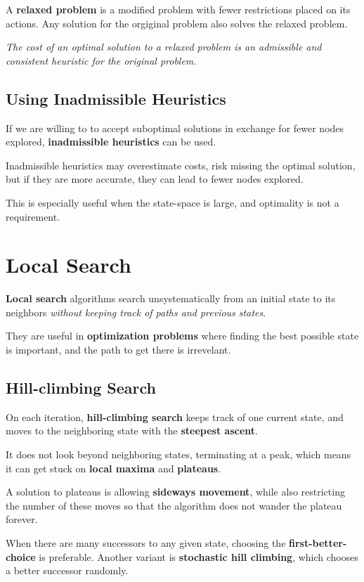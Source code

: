 \begin{multicols*}{2}
            A \textbf{relaxed problem} is a modified problem with fewer restrictions placed on its actions. Any solution for the orgiginal problem also solves the relaxed problem.

            \emph{The cost of an optimal solution to a relaxed problem is an admissible and consistent heuristic for the original problem.}

        \subsection{Using Inadmissible Heuristics}
            If we are willing to to accept suboptimal solutions in exchange for fewer nodes explored, \textbf{inadmissible heuristics} can be used.

            Inadmissible heuristics may overestimate costs, risk missing the optimal solution, but if they are more accurate, they can lead to fewer nodes explored.

            This is especially useful when the state-space is large, and optimality is not a requirement.

    \section{Local Search}
        \textbf{Local search} algorithms search unsystematically from an initial state to its neighbors \emph{without keeping track of paths and previous states}.

        They are useful in \textbf{optimization problems} where finding the best possible state is important, and the path to get there is irrevelant.

        \subsection{Hill-climbing Search}
            On each iteration, \textbf{hill-climbing search} keeps track of one current state, and moves to the neighboring state with the \textbf{steepest ascent}.

            It does not look beyond neighboring states, terminating at a peak, which means it can get stuck on \textbf{local maxima} and \textbf{plateaus}.

            A solution to plateaus is allowing \textbf{sideways movement}, while also restricting the number of these moves so that the algorithm does not wander the plateau forever.

            When there are many successors to any given state, choosing the \textbf{first-better-choice} is preferable. Another variant is \textbf{stochastic hill climbing}, which chooses a better successor randomly.


\end{multicols*}
